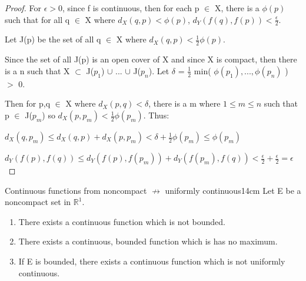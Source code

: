     \begin{proof}
        For $\epsilon > 0$, since f is continuous, then for each
        p $\in$ X, there is a $\phi(p)$ such that for all q $\in$ X
        where $d_X(q,p) < \phi(p)$, $d_Y(f(q),f(p)) < \frac{\epsilon}{2}$.

        Let J(p) be the set of all q $\in$ X where
        $d_X(q,p) < \frac{1}{2}\phi(p)$.

        Since the set of all J(p) is an open cover of X and since X is compact,
        then there is a n such that X $\subset$ J($p_1$) $\cup$ ... $\cup$ J($p_n$).
        Let $\delta$ = $\frac{1}{2}$ min( $\phi(p_1), ... , \phi(p_n)$ ) $>$ 0.

        Then for p,q $\in$ X where $d_X(p,q) < \delta$, there is a m where
        $1 \leq m \leq n$ such that p $\in$ J($p_m$) so
        $d_X(p,p_m) < \frac{1}{2} \phi(p_m)$. Thus:

        \hspace{1cm}
        $d_X(q,p_m) \leq d_X(q,p) + d_X(p,p_m) < \delta + \frac{1}{2} \phi(p_m)
        \leq \phi(p_m)$

        \hspace{1cm}
        $d_Y(f(p),f(q)) \leq d_Y(f(p),f(p_m)) + d_Y(f(p_m),f(q))
        < \frac{\epsilon}{2} + \frac{\epsilon}{2} = \epsilon$
    \end{proof}

    \vspace{0.5cm}



    \begin{wtheorem}{Continuous functions from noncompact
    $\not \rightarrow$ uniformly continuous}{14cm}
        Let E be a noncompact set in $\mathbb{R}^1$.

        \begin{enumerate}[label=(\alph*), leftmargin=1cm, itemsep=0.1cm]
            \item There exists a continuous function which is not bounded.
            
            \item There exists a continuous, bounded function which is
            has no maximum.
            
            \item If E is bounded, there exists a continuous function which
            is not uniformly continuous.
        \end{enumerate}
    \end{wtheorem}
    
